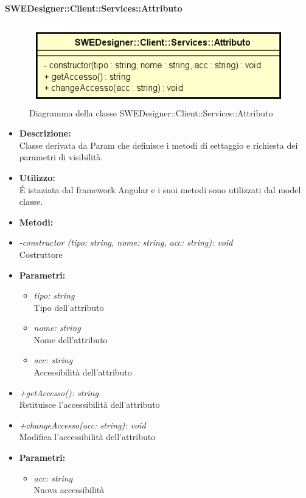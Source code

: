           	\paragraph{SWEDesigner::Client::Services::Attributo}
          	\begin{figure}[h!]
			\centering
			\includegraphics[scale=0.8]{Classi/SWEDesigner__Client__Services__Attributo.png}
			\caption{Diagramma della classe SWEDesigner::Client::Services::Attributo}
 			\end{figure}
				\begin{itemize}
          			\item \textbf{Descrizione:}\\
          			Classe derivata da Param che definisce i metodi di settaggio e richiesta dei parametri di visibilità.
          			\item \textbf{Utilizzo:}\\
          			É istaziata dal framework Angular e i suoi metodi sono utilizzati dal model classe.
          			\item \textbf{Metodi:}\\
          				\item \emph{-constructor (tipo: string, nome: string, acc: string): void}\\
          				Costruttore
          				\item \textbf{Parametri:}\\
            				\begin{itemize}
            					\item \emph{tipo: string}\\
            					Tipo dell'attributo
            					\item \emph{nome: string}\\
            					Nome dell'attributo
            					\item \emph{acc: string}\\
            					Accessibilità dell'attributo
            				\end{itemize}
            			\item \emph{+getAccesso(): string}\\
          				Rstituisce l'accessibilità dell'attributo
          				\item \emph{+changeAccesso(acc: string): void}\\
          				Modifica l'accessibilità dell'attributo
          				\item \textbf{Parametri:}\\
            				\begin{itemize}
            					\item \emph{acc: string}\\
            					Nuova accessibilità
            				\end{itemize}
          		\end{itemize}
